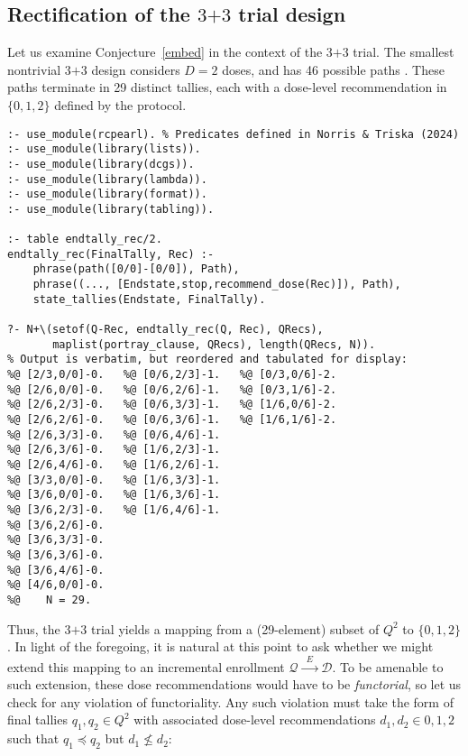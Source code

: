 \documentclass{article}
\begin{document}
\subsection{Rectification of the $\mbox{3+3}$ trial design}

Let us examine Conjecture~\ref{embed} in the context of the $\mbox{3+3}$ trial.  The smallest nontrivial $\mbox{3+3}$ design considers $D = 2$ doses, and has 46 possible paths \cite{norris_executable_2024}.  These paths terminate in 29 distinct tallies, each with a dose-level recommendation in $\{0, 1, 2\}$ defined by the protocol.

\begin{verbatim}
:- use_module(rcpearl). % Predicates defined in Norris & Triska (2024)
:- use_module(library(lists)).
:- use_module(library(dcgs)).
:- use_module(library(lambda)).
:- use_module(library(format)).
:- use_module(library(tabling)).

:- table endtally_rec/2.
endtally_rec(FinalTally, Rec) :-
    phrase(path([0/0]-[0/0]), Path),
    phrase((..., [Endstate,stop,recommend_dose(Rec)]), Path),
    state_tallies(Endstate, FinalTally).

?- N+\(setof(Q-Rec, endtally_rec(Q, Rec), QRecs),
       maplist(portray_clause, QRecs), length(QRecs, N)).
% Output is verbatim, but reordered and tabulated for display:
%@ [2/3,0/0]-0.   %@ [0/6,2/3]-1.   %@ [0/3,0/6]-2.
%@ [2/6,0/0]-0.   %@ [0/6,2/6]-1.   %@ [0/3,1/6]-2.
%@ [2/6,2/3]-0.   %@ [0/6,3/3]-1.   %@ [1/6,0/6]-2.
%@ [2/6,2/6]-0.   %@ [0/6,3/6]-1.   %@ [1/6,1/6]-2.
%@ [2/6,3/3]-0.   %@ [0/6,4/6]-1.
%@ [2/6,3/6]-0.   %@ [1/6,2/3]-1.
%@ [2/6,4/6]-0.   %@ [1/6,2/6]-1.
%@ [3/3,0/0]-0.   %@ [1/6,3/3]-1.
%@ [3/6,0/0]-0.   %@ [1/6,3/6]-1.
%@ [3/6,2/3]-0.   %@ [1/6,4/6]-1.
%@ [3/6,2/6]-0.
%@ [3/6,3/3]-0.
%@ [3/6,3/6]-0.
%@ [3/6,4/6]-0.
%@ [4/6,0/0]-0.
%@    N = 29.
\end{verbatim}

Thus, the $\mbox{3+3}$ trial yields a mapping from a (29-element) subset of $Q^2$ to $\{0,1,2\}$.  In light of the foregoing, it is natural at this point to ask whether we might extend this mapping to an incremental enrollment $\mathcal{Q} \xrightarrow{\;\;E\;\;} \mathcal{D}$.  To be amenable to such extension, these dose recommendations would have to be {\em functorial}, so let us check for any violation of functoriality.  Any such violation must take the form of final tallies $q_1, q_2 \in Q^2$ with associated dose-level recommendations $d_1, d_2 \in {0,1,2}$ such that $q_1 \preceq q_2$ but $d_1 \not\leq d_2$:
\end{document}
